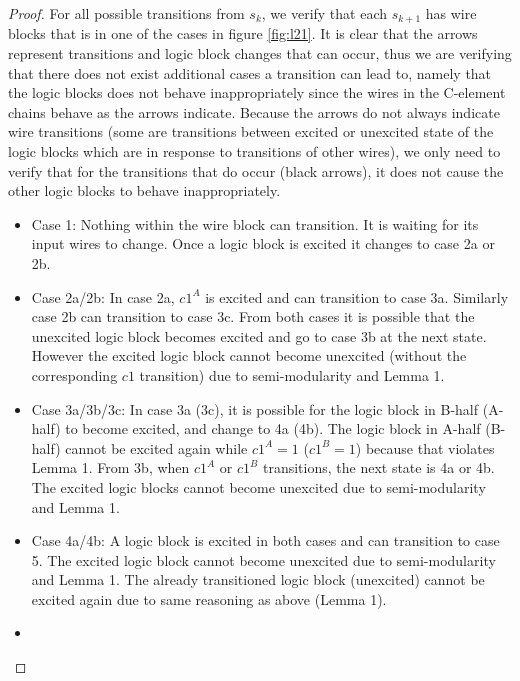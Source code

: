 \documentclass[12pt]{report}
\begin{document}
\begin{proof}
For all possible transitions from $s_k$, we verify that each $s_{k+1}$ has wire blocks that is in one of the cases in figure \ref{fig:l21}.  It is clear that the arrows represent transitions and logic block changes that can occur, thus we are verifying that there does not exist additional cases a transition can lead to, namely that the logic blocks does not behave inappropriately since the wires in the C-element chains behave as the arrows indicate.  Because the arrows do not always indicate wire transitions (some are transitions between excited or unexcited state of the logic blocks which are in response to transitions of other wires), we only need to verify that for the transitions that do occur (black arrows), it does not cause the other logic blocks to behave inappropriately.
\begin{itemize}
\item
Case 1:  Nothing within the wire block can transition.  It is waiting for its input wires to change.  Once a logic block is excited it changes to case 2a or 2b. %
\item
Case 2a/2b:  In case 2a, $c1^A$ is excited and can transition to case 3a.  Similarly case 2b can transition to case 3c.  From both cases it is possible that the unexcited logic block becomes excited and go to case 3b at the next state.  However the excited logic block cannot become unexcited (without the corresponding $c1$ transition) due to semi-modularity and Lemma 1.
\item
Case 3a/3b/3c:  In case 3a (3c), it is possible for the logic block in B-half (A-half) to become excited, and change to 4a (4b).  The logic block in A-half (B-half) cannot be excited again while $c1^A=1$ ($c1^B=1$) because that violates Lemma 1.  From 3b, when $c1^A$ or $c1^B$ transitions, the next state is 4a or 4b.  The excited logic blocks cannot become unexcited due to semi-modularity and Lemma 1.
\item
Case 4a/4b:
A logic block is excited in both cases and can transition to case 5.  The excited logic block cannot become unexcited due to semi-modularity and Lemma 1.  The already transitioned logic block (unexcited) cannot be excited again due to same reasoning as above (Lemma 1).
\item

\end{itemize}
\end{proof}
\end{document}
